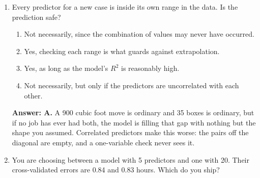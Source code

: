 \documentclass[11pt]{article}
\begin{document}
\begin{enumerate}[itemsep=14pt]
\begin{enumerate}[label=\Alph*., itemsep=1pt, topsep=3pt]
  \item That weekends have no effect at all on how long one of these jobs takes.
  \item That an ordinary regression would also put the weekend coefficient at zero.
  \item That weekends are unrelated to each of the other predictors in the model.
  \item That the column did not earn its keep against the penalty, beside these others.
\end{enumerate}

\vspace{2pt}
\textbf{Answer: D.} A zero from lasso is the result of a choice about the penalty. Change the penalty, the sample, or the other columns and the same variable can come back. It says the column was not worth its cost here, which is a narrower claim than having no effect.
\vspace{4pt}

\item Every predictor for a new case is inside its own range in the data. Is the prediction safe?

\begin{enumerate}[label=\Alph*., itemsep=1pt, topsep=3pt]
  \item Not necessarily, since the combination of values may never have occurred.
  \item Yes, checking each range is what guards against extrapolation.
  \item Yes, as long as the model's $R^2$ is reasonably high.
  \item Not necessarily, but only if the predictors are uncorrelated with each other.
\end{enumerate}

\vspace{2pt}
\textbf{Answer: A.} A 900 cubic foot move is ordinary and 35 boxes is ordinary, but if no job has ever had both, the model is filling that gap with nothing but the shape you assumed. Correlated predictors make this worse: the pairs off the diagonal are empty, and a one-variable check never sees it.
\vspace{4pt}

\item You are choosing between a model with 5 predictors and one with 20. Their cross-validated errors are 0.84 and 0.83 hours. Which do you ship?


\end{enumerate}
\end{document}

